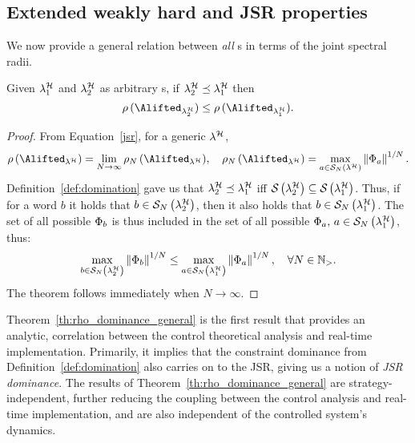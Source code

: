 \subsection{Extended weakly hard and JSR properties}
\label{sec:analytic_results}
We now provide a general relation between \emph{all} \ewhc{}s in terms of the joint spectral radii.
%
\begin{theorem}
    \label{th:rho_dominance_general}
    Given $\lambda_1^{\mathcal{H}}$ and $\lambda_2^{\mathcal{H}}$ as arbitrary \ewhc{}s, if $\lambda_2^{\mathcal{H}} \preceq \lambda_1^{\mathcal{H}}$ then
    $$
        \rho\,(\Alifted_{\lambda_2^\strat}) \leq \rho\,(\Alifted_{\lambda_1^\strat}).
    $$
%
    \begin{proof}
        From Equation~\eqref{jsr}, for a generic \ewhc{} $\lambda^{\mathcal{H}}$,
        \begin{equation*}
            \rho\,(\Alifted_{\lambda^\strat}) = \lim_{N\rightarrow \infty} \rho_N \,(\Alifted_{\lambda^\strat}), \quad 
            \rho_N\,(\Alifted_{\lambda^\strat}) = \max_{a \in \sset{N}{\lambda^\strat}}\norm{\clmat_{a}}^{1/N}.
        \end{equation*}
        Definition~\ref{def:domination} gave us that $\lambda^{\mathcal{H}}_2 \preceq \lambda^{\mathcal{H}}_1$ iff $\mathcal{S}_{}\left( \lambda^{\mathcal{H}}_2 \right) \subseteq \mathcal{S}_{}\left( \lambda^{\mathcal{H}}_1 \right)$.
        Thus, if for a word $b$ it holds that $b \in \mathcal{S}_{N}\left( \lambda^{\mathcal{H}}_2 \right)$, then it also holds that $b \in \mathcal{S}_{N}\left( \lambda^{\mathcal{H}}_1 \right)$.
        The set of all possible $\Phi_{b}$ is thus included in the set of all possible $\Phi_{a},\, a \in \mathcal{S}_{N}\left( \lambda^{\mathcal{H}}_1 \right)$, thus:
        \begin{equation*}
            \max_{b \in \mathcal{S}_{N}\left( \lambda^{\mathcal{H}}_2 \right)}\left\lVert\Phi_{b}\right\rVert^{1/N} \leq
            \max_{a \in \mathcal{S}_{N}\left( \lambda^{\mathcal{H}}_1 \right)}\left\lVert\Phi_{a}\right\rVert^{1/N}, \quad \forall N \in \mathbb{N}_{>}.
        \end{equation*}
        The theorem follows immediately when $N\rightarrow \infty$.
    \end{proof}
\end{theorem}
%
Theorem~\ref{th:rho_dominance_general} is the first result that provides an analytic, correlation between the control theoretical analysis and real-time implementation.
Primarily, it implies that the constraint dominance from Definition~\ref{def:domination} also carries on to the JSR, giving us a notion of \emph{JSR dominance}.
The results of Theorem~\ref{th:rho_dominance_general} are strategy-independent, further reducing the coupling between the control analysis and real-time implementation, and are also independent of the controlled system's dynamics.

